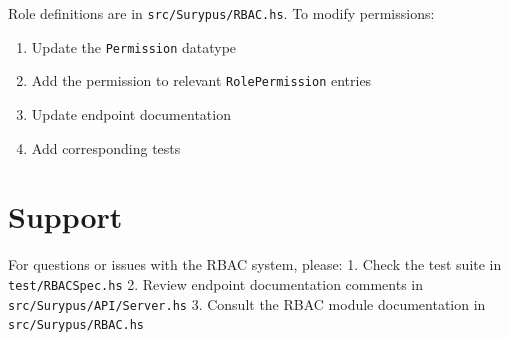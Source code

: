 Role definitions are in \texttt{src/Surypus/RBAC.hs}. To modify
permissions:

\begin{enumerate}
\def\labelenumi{\arabic{enumi}.}
\tightlist
\item
  Update the \texttt{Permission} datatype
\item
  Add the permission to relevant \texttt{RolePermission} entries
\item
  Update endpoint documentation
\item
  Add corresponding tests
\end{enumerate}

\section{Support}\label{support}

For questions or issues with the RBAC system, please: 1. Check the test
suite in \texttt{test/RBACSpec.hs} 2. Review endpoint documentation
comments in \texttt{src/Surypus/API/Server.hs} 3. Consult the RBAC
module documentation in \texttt{src/Surypus/RBAC.hs}
